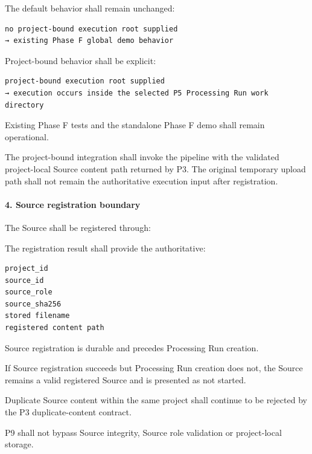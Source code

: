 The default behavior shall remain unchanged:

\begin{verbatim}
no project-bound execution root supplied
→ existing Phase F global demo behavior
\end{verbatim}

Project-bound behavior shall be explicit:

\begin{verbatim}
project-bound execution root supplied
→ execution occurs inside the selected P5 Processing Run work directory
\end{verbatim}

Existing Phase F tests and the standalone Phase F demo shall remain operational.

The project-bound integration shall invoke the pipeline with the validated project-local Source content path returned by P3. The original temporary upload path shall not remain the authoritative execution input after registration.

\hypertarget{4-source-registration-boundary}{%
\paragraph{4. Source registration boundary}\label{4-source-registration-boundary}}

The Source shall be registered through:

\begin{Shaded}
\begin{Highlighting}[]
\end{Highlighting}
\end{Shaded}

The registration result shall provide the authoritative:

\begin{verbatim}
project_id
source_id
source_role
source_sha256
stored filename
registered content path
\end{verbatim}

Source registration is durable and precedes Processing Run creation.

If Source registration succeeds but Processing Run creation does not, the Source remains a valid registered Source and is presented as not started.

Duplicate Source content within the same project shall continue to be rejected by the P3 duplicate-content contract.

P9 shall not bypass Source integrity, Source role validation or project-local storage.

